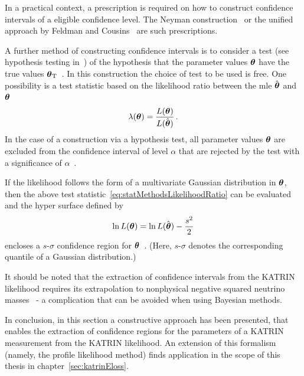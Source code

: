 In a practical context, a prescription is required on how to construct confidence intervals of a eligible confidence level. The Neyman construction~\cite{Neyman1937} or the unified approach by Feldman and Cousins~\cite{Feldman1998} are such prescriptions.

A further method of constructing confidence intervals is to consider a test (see hypothesis testing in~\cite{ReviewOfParticlePhysics}) of the hypothesis that the parameter values $\boldsymbol{\mathbf{\theta}}$ have the true values $\boldsymbol{\mathbf{\theta}}_\mathrm{T}$~\cite{ReviewOfParticlePhysics}. In this construction the choice of test to be used is free. One possibility is a test statistic based on the likelihood ratio between the \gls{mle} $\hat{\boldsymbol{\mathbf{\theta}}}$ and $\boldsymbol{\mathbf{\theta}}$~\cite{ReviewOfParticlePhysics}
\begin{equation}
	\label{eq:statMethodsLikelihoodRatio}
	\lambda(\boldsymbol{\mathbf{\theta}}) =
	\frac{L(\boldsymbol{\mathbf{\theta}})}{L(\hat{\boldsymbol{\mathbf{\theta}}})}
	\text{\,.}
\end{equation}
In the case of a construction via a hypothesis test, all parameter values $\boldsymbol{\mathbf{\theta}}$ are excluded from the confidence interval of level $\alpha$ that are rejected by the test with a significance of $\alpha$~\cite{ReviewOfParticlePhysics}.

If the likelihood follows the form of a multivariate Gaussian distribution in $\boldsymbol{\mathbf{\theta}}$, then the above test statistic~\eqref{eq:statMethodsLikelihoodRatio} can be evaluated and the hyper surface defined by
\begin{equation}
	\label{eq:statMethodsConfidenceContour}
	\ln L(\boldsymbol{\mathbf{\theta}}) = 	\ln L(\hat{\boldsymbol{\mathbf{\theta}}}) - \frac{s^2}{2}
\end{equation}
encloses a $s$-$\sigma$ confidence region for $\boldsymbol{\mathbf{\theta}}$~\cite{ReviewOfParticlePhysics}. (Here, $s$-$\sigma$ denotes the corresponding quantile of a Gaussian distribution.) 

It should be noted that the extraction of confidence intervals from the KATRIN likelihood requires its extrapolation to nonphysical negative squared neutrino masses~\cite{Kleesiek2014} - a complication that can be avoided when using Bayesian methods.

In conclusion, in this section a constructive approach has been presented, that enables the extraction of confidence regions for the parameters of a KATRIN measurement from the KATRIN likelihood. An extension of this formalism (namely, the profile likelihood method) finds application in the scope of this thesis in chapter~\ref{sec:katrinEloss}.

